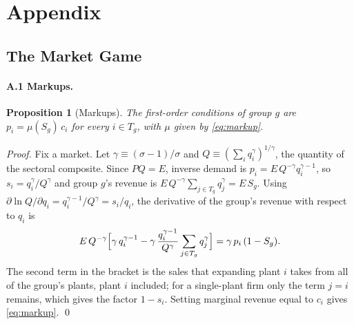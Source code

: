 \documentclass[11pt]{article}
\newtheorem{proposition}{Proposition}
\begin{document}
\clearpage
\section*{Appendix}
\renewcommand{\theHsubsection}{app.\Alph{subsection}}
\renewcommand{\theHequation}{app.\arabic{equation}}
\setcounter{subsection}{0}
\renewcommand{\thesubsection}{\Alph{subsection}}

\subsection{The Market Game}
\label{app:market}

\paragraph{A.1 Markups.}\leavevmode
\begin{proposition}[Markups]\label{prop:markup}
The first-order conditions of group $g$ are $p_i=\mu(S_g)\,c_i$ for every $i\in T_g$,
with $\mu$ given by \eqref{eq:markup}.
\end{proposition}
\noindent\emph{Proof.} Fix a market. Let
$\gamma\equiv(\sigma-1)/\sigma$ and $Q\equiv(\sum_iq_i^{\gamma})^{1/\gamma}$, the
quantity of the sectoral composite. Since $PQ=E$, inverse demand is
$p_i=E\,Q^{-\gamma}q_i^{\gamma-1}$, so $s_i=q_i^\gamma/Q^\gamma$ and group $g$'s revenue
is $E\,Q^{-\gamma}\sum_{j\in T_g}q_j^{\gamma}=E\,S_g$. Using
$\partial\ln Q/\partial q_i=q_i^{\gamma-1}/Q^{\gamma}=s_i/q_i$, the derivative of the
group's revenue with respect to $q_i$ is
\[
  E\,Q^{-\gamma}\Bigl[\gamma\,q_i^{\gamma-1}-\gamma\,\frac{q_i^{\gamma-1}}{Q^\gamma}
  \sum_{j\in T_g}q_j^\gamma\Bigr]
  =\gamma\,p_i\,(1-S_g).
\]
The second term in the bracket is the sales that expanding plant $i$ takes from all
of the group's plants, plant $i$ included; for a single-plant firm only the term
$j=i$ remains, which gives the factor $1-s_i$. Setting marginal revenue equal to $c_i$
gives \eqref{eq:markup}. \qed
\end{document}
